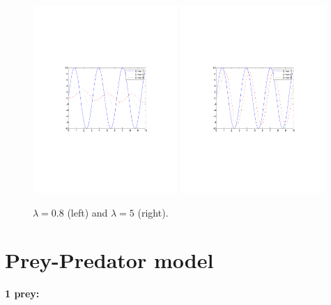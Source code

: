 \begin{figure}[htbp]
\begin{center}
\includegraphics[width=0.49\textwidth]{../figs_06_traffic_flow/traffic_flow_3cars_ODE_l08}
\includegraphics[width=0.49\textwidth]{../figs_06_traffic_flow/traffic_flow_3cars_ODE_l5}
\end{center}
\caption{$\lambda=0.8$ (left) and $\lambda=5$ (right).}
\end{figure}





















\section{Prey-Predator model}
{\bf 1 prey:}


